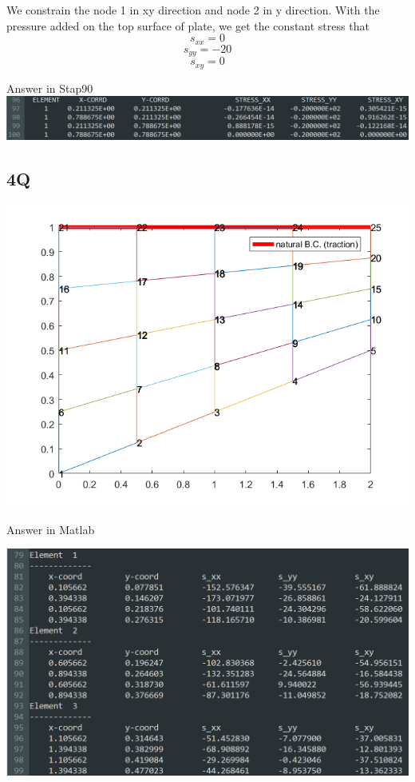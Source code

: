 \documentclass[UTF8]{ctexbook}
\begin{document}
We constrain the node 1 in xy direction and node 2 in y direction. With the pressure added on the top surface of plate, we get the constant stress that
$$s_{xx} = 0$$
$$s_{yy} = -20$$
$$s_{xy} = 0$$

Answer in Stap90\\

\includegraphics[width=\textwidth]{4Q03.png}

\subsection{4Q}

\includegraphics[width=\textwidth]{Example_4Q.png}

\newpage
Answer in Matlab

\includegraphics[width=\textwidth]{4Q01.png}
\end{document}
